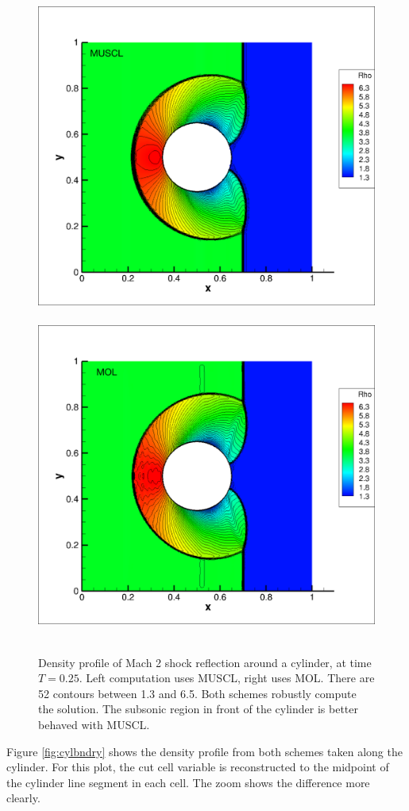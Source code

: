 \begin{figure}[h]
\centering
\vspace*{-.25in}
\hspace*{-.2in}
\mbox{
\includegraphics[width=0.50\linewidth,trim=10 10 200 10,clip]{figs/muscl_302cells.png}
\hspace*{.15in}
\includegraphics[width=0.50\linewidth,trim=10 10 200 10,clip]{figs/MOL_302cells.png}
}
\caption{\sf Density profile of Mach 2 shock reflection around a cylinder,
at time $T = 0.25$.  Left computation uses MUSCL, right uses MOL. 
There are 52 contours between 1.3 and 6.5.
Both schemes robustly compute the solution. 
The subsonic region in front of the cylinder is better behaved with MUSCL.
\label{fig:cyl1}}
\vspace*{-.1in}
\end{figure}

Figure \ref{fig:cylbndry}
shows the density profile from both schemes
taken along the cylinder.
For this plot, the cut cell variable is
reconstructed to the midpoint of the cylinder line segment in each  cell.  
The zoom shows the difference more
clearly.

